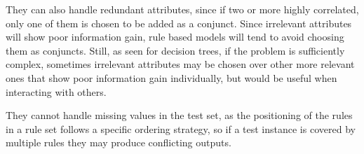They can also handle redundant attributes, since if two or more highly correlated, only one of them is chosen to be added as a conjunct. Since irrelevant attributes will show poor information gain, rule based models will tend to avoid choosing them as conjuncts. Still, as seen for decision trees, if the problem is sufficiently complex, sometimes irrelevant attributes may be chosen over other more relevant ones that show poor information gain individually, but would be useful when interacting with others.

They cannot handle missing values in the test set, as the positioning of the rules in a rule set follows a specific ordering strategy, so if a test instance is covered by multiple rules they may produce conflicting outputs.